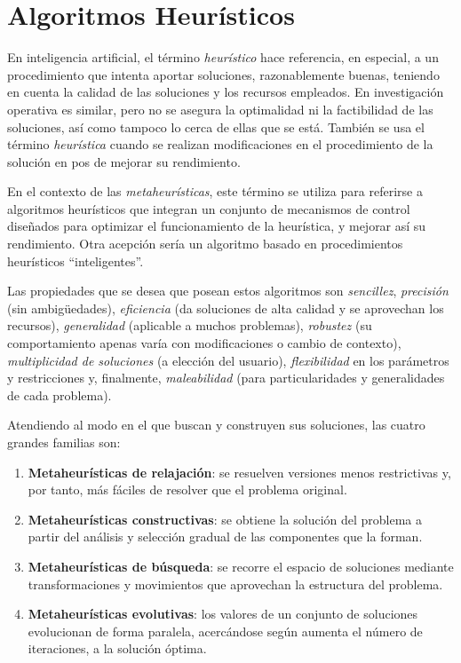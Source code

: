 \section{Algoritmos Heurísticos}
En inteligencia artificial, el término {\sl heurístico} hace referencia, en especial, a un procedimiento que intenta aportar soluciones, razonablemente buenas, teniendo en cuenta la calidad de las soluciones y los recursos empleados. En investigación operativa es similar, pero no se asegura la optimalidad ni la factibilidad de las soluciones, así como tampoco lo cerca de ellas que se está. También se usa el término {\sl heurística} cuando se realizan modificaciones en el procedimiento de la solución en pos de mejorar su rendimiento.

En el contexto de las {\sl metaheurísticas}, este término se utiliza para referirse a algoritmos heurísticos que integran un conjunto de mecanismos de control diseñados para optimizar el funcionamiento de la heurística, y mejorar así su rendimiento. Otra acepción sería un algoritmo basado en procedimientos
heurísticos “inteligentes”.

Las propiedades que se desea que posean estos algoritmos son {\sl sencillez}, {\sl precisión} (sin ambigüedades), {\sl eficiencia} (da soluciones de alta calidad y se aprovechan los recursos), {\sl generalidad} (aplicable a muchos problemas), {\sl robustez} (su comportamiento apenas varía con modificaciones o cambio de contexto), {\sl multiplicidad de soluciones} (a elección del usuario), {\sl flexibilidad} en los parámetros y restricciones y, finalmente, {\sl maleabilidad} (para particularidades y generalidades de cada problema). 

Atendiendo al modo en el que buscan y construyen sus soluciones, las cuatro grandes familias son:
\begin{enumerate}
    \item {\bf Metaheurísticas de relajación}:  se resuelven versiones menos restrictivas y, por tanto, más fáciles de resolver que el problema original.
    \item {\bf Metaheurísticas constructivas}: se obtiene la solución del problema a partir del análisis y selección gradual de las componentes que la forman.
    \item {\bf Metaheurísticas de búsqueda}: se recorre el espacio de soluciones mediante transformaciones y movimientos que aprovechan la estructura del problema.
    \item {\bf Metaheurísticas evolutivas}: los valores de un conjunto de soluciones evolucionan de forma paralela, acercándose según aumenta el número de iteraciones, a la solución óptima.
\end{enumerate}

